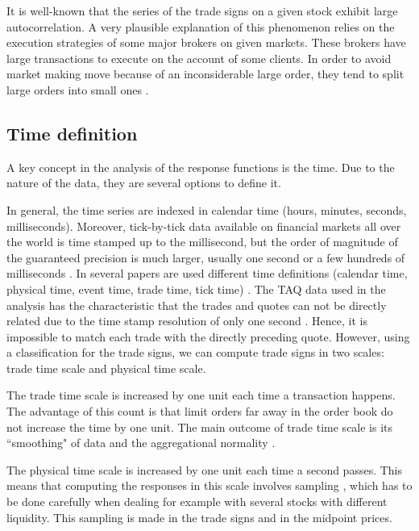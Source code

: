It is well-known that the series of the trade signs on a given stock exhibit
large autocorrelation. A very plausible explanation of this phenomenon relies
on the execution strategies of some major brokers on given markets. These
brokers have large transactions to execute on the account of some clients. In
order to avoid market making move because of an inconsiderable large order,
they tend to split large orders into small ones \cite{empirical_facts}.

\subsection{Time definition}\label{subsec:time_definition}

A key concept in the analysis of the response functions is the time. Due to the
nature of the data, they are several options to define it.

In general, the time series are indexed in calendar time (hours, minutes,
seconds, milliseconds). Moreover, tick-by-tick data available on financial
markets all over the world is time stamped up to the millisecond, but the order
of magnitude of the guaranteed precision is much larger, usually one second or
a few hundreds of milliseconds \cite{market_digest,empirical_facts}. In several
papers are used different time definitions (calendar time, physical time, event
time, trade time, tick time)
\cite{empirical_facts,sampling_returns,market_making}. The TAQ data used in the
analysis has the characteristic that the trades and quotes can not be directly
related due to the time stamp resolution of only one second
\cite{Wang_2016_cross}. Hence, it is impossible to match each trade with the
directly preceding quote. However, using a classification for the trade signs,
we can compute trade signs in two scales: trade time scale and physical time
scale.

The trade time scale is increased by one unit each time a transaction happens.
The advantage of this count is that limit orders far away in the order book do
not increase the time by one unit. The main outcome of trade time scale is its
``smoothing" of data and the aggregational normality \cite{empirical_facts}.

The physical time scale is increased by one unit each time a second passes.
This means that computing the responses in this scale involves sampling
\cite{sampling_returns,Wang_2016_cross}, which has to be done carefully when
dealing for example with several stocks with different liquidity. This sampling
is made in the trade signs and in the midpoint prices.

